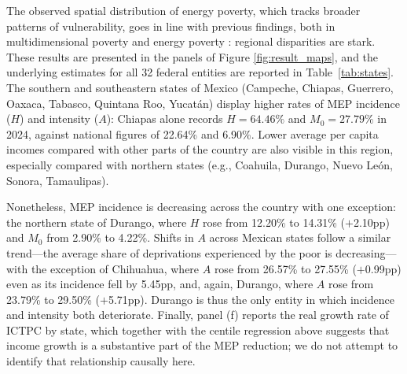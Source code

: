 \documentclass[11pt, a4paper]{article}
\begin{document}
The observed spatial distribution of energy poverty, which tracks broader patterns of vulnerability, goes in line with previous findings, both in multidimensional poverty \parencite{coneval2019a, zotero-item-1075} and energy poverty \parencite{garcia-ochoa2016, jimeneztorres2026}: regional disparities are stark. These results are presented in the panels of Figure \ref{fig:result_maps}, and the underlying estimates for all 32 federal entities are reported in Table~\ref{tab:states}. The southern and southeastern states of Mexico (Campeche, Chiapas, Guerrero, Oaxaca, Tabasco, Quintana Roo, Yucatán) display higher rates of MEP incidence ($H$) and intensity ($A$): Chiapas alone records $H = 64.46\%$ and $M_0 = 27.79\%$ in 2024, against national figures of 22.64\% and 6.90\%. Lower average per capita incomes compared with other parts of the country are also visible in this region, especially compared with northern states (e.g., Coahuila, Durango, Nuevo León, Sonora, Tamaulipas). 

Nonetheless, MEP incidence is decreasing across the country with one exception: the northern state of Durango, where $H$ rose from 12.20\% to 14.31\% ($+$2.10pp) and $M_0$ from 2.90\% to 4.22\%. Shifts in $A$ across Mexican states follow a similar trend---the average share of deprivations experienced by the poor is decreasing---with the exception of Chihuahua, where $A$ rose from 26.57\% to 27.55\% ($+$0.99pp) even as its incidence fell by 5.45pp, and, again, Durango, where $A$ rose from 23.79\% to 29.50\% ($+$5.71pp). Durango is thus the only entity in which incidence and intensity both deteriorate. Finally, panel (f) reports the real growth rate of ICTPC by state, which together with the centile regression above suggests that income growth is a substantive part of the MEP reduction; we do not attempt to identify that relationship causally here. 
\end{document}
